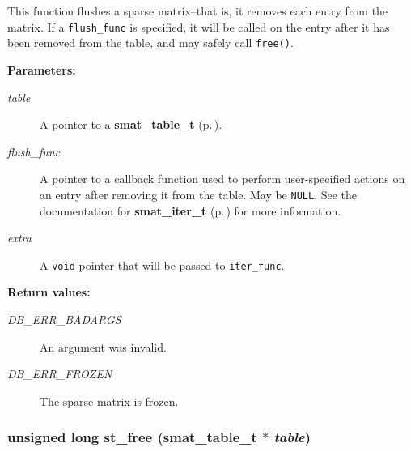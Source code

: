 This function flushes a sparse matrix--that is, it removes each entry from the matrix. If a {\tt flush\_\-func} is specified, it will be called on the entry after it has been removed from the table, and may safely call {\tt free()}.\begin{Desc}
\item[{\bf Parameters: }]\par
\begin{description}
\item[
{\em table}]A pointer to a {\bf smat\_\-table\_\-t} {\rm (p.\,\pageref{group__dbprim__smat_a0})}. \item[
{\em flush\_\-func}]A pointer to a callback function used to perform user-specified actions on an entry after removing it from the table. May be {\tt NULL}. See the documentation for {\bf smat\_\-iter\_\-t} {\rm (p.\,\pageref{group__dbprim__smat_a4})} for more information. \item[
{\em extra}]A {\tt void} pointer that will be passed to {\tt iter\_\-func}.\end{description}
\end{Desc}
\begin{Desc}
\item[{\bf Return values: }]\par
\begin{description}
\item[
{\em DB\_\-ERR\_\-BADARGS}]An argument was invalid. \item[
{\em DB\_\-ERR\_\-FROZEN}]The sparse matrix is frozen. \end{description}
\end{Desc}
\subsubsection{\setlength{\rightskip}{0pt plus 5cm}unsigned long st\_\-free ({\bf smat\_\-table\_\-t} $\ast$ {\em table})}\label{group__dbprim__smat_a16}




